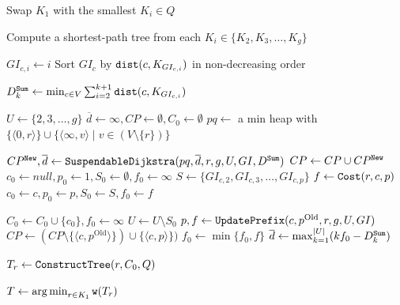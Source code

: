 \begin{algorithm}[t]
    
    Swap $K_1$ with the smallest $K_i \in Q$\;
    
    Compute a shortest-path tree from each $K_i\in \{K_2,K_3,\dots,K_g\}$\;
    
    {
        {
            $GI_{c,i} \leftarrow i$\;
        }
        Sort $GI_c$ by $\mathtt{dist}(c,K_{GI_{c,i}})$ in non-decreasing order\;
    }

    {
        \(D^{\texttt{Sum}}_k \leftarrow \min_{c\in V}\sum_{i=2}^{k+1}\mathtt{dist}(c,K_{GI_{c,i}})\)\;
    }
    

    {
        $U \leftarrow \{2,3,\dots,g\}$\;
        $\overline{d} \leftarrow \infty, CP \leftarrow \emptyset, C_0 \leftarrow \emptyset$\;
        $pq \leftarrow$ a min heap with $\{\langle 0,r \rangle\} \cup \{\langle \infty,v \rangle \mid v \in (V \setminus \{r\}) \}$\;
        
        {
            \(CP^{\mathtt{New}},\overline{d}\leftarrow \mathtt{SuspendableDijkstra}(pq,\overline{d},r,g,U,GI,{D^{\texttt{Sum}}}) \)\;
            \(CP \leftarrow CP \cup CP^{\mathtt{New}}\)\;
            \(c_0\leftarrow null, p_0 \leftarrow 1, S_0 \leftarrow \emptyset, f_0\leftarrow \infty\)\;
            {
                $S \leftarrow \{GI_{c,2},GI_{c,3},\dots,GI_{c,p}\}$\;
                $f \leftarrow \mathtt{Cost}(r,c,p)$\;
                {
                    $c_0 \leftarrow c, p_0 \leftarrow p, S_0 \leftarrow S, f_0 \leftarrow f$\;
                }
            }
            
            \(C_0\leftarrow C_0\cup \{c_0\}, f_0 \leftarrow \infty\)\;
            \(U \leftarrow U\setminus S_0\)\;
            {   
                \(p,f\leftarrow \mathtt{UpdatePrefix}(c, p^\text{Old}, r, g, U, GI)\)\;
                $CP \leftarrow (CP \setminus \{\langle c,p^\text{Old} \rangle\}) \cup \{\langle c,p \rangle\})$\;
                \(f_0\leftarrow \min\{f_0,f\}\)\;
            }
            \(\overline{d} \leftarrow \max_{k=1}^{|U|}(kf_0-D^{\texttt{Sum}}_k)\)\;
        }
        \(T_r\leftarrow \mathtt{ConstructTree}(r,C_0,Q)\)\;
    }
    $T \leftarrow \operatorname*{arg\,min}_{r \in K_1}{\mathtt{w}(T_r)}$\;
    
\caption{\Improved} 
\label{alg: Improved}
\end{algorithm}

